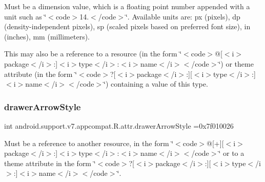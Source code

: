 Must be a dimension value, which is a floating point number appended with a unit such as \char`\"{}$<$code$>$14.\+5sp$<$/code$>$\char`\"{}. Available units are\+: px (pixels), dp (density-\/independent pixels), sp (scaled pixels based on preferred font size), in (inches), mm (millimeters). 

This may also be a reference to a resource (in the form \char`\"{}$<$code$>$@\mbox{[}$<$i$>$package$<$/i$>$\+:\mbox{]}$<$i$>$type$<$/i$>$\+:$<$i$>$name$<$/i$>$$<$/code$>$\char`\"{}) or theme attribute (in the form \char`\"{}$<$code$>$?\mbox{[}$<$i$>$package$<$/i$>$\+:\mbox{]}\mbox{[}$<$i$>$type$<$/i$>$\+:\mbox{]}$<$i$>$name$<$/i$>$$<$/code$>$\char`\"{}) containing a value of this type. \mbox{\label{classandroid_1_1support_1_1v7_1_1appcompat_1_1R_1_1attr_ac61eb48305cf35bb5538f1431089e7b1}} 
\subsubsection{\texorpdfstring{drawer\+Arrow\+Style}{drawerArrowStyle}}
{\footnotesize\ttfamily int android.\+support.\+v7.\+appcompat.\+R.\+attr.\+drawer\+Arrow\+Style =0x7f010026\hspace{0.3cm}{\ttfamily [static]}}

Must be a reference to another resource, in the form \char`\"{}$<$code$>$@\mbox{[}+\mbox{]}\mbox{[}$<$i$>$package$<$/i$>$\+:\mbox{]}$<$i$>$type$<$/i$>$\+:$<$i$>$name$<$/i$>$$<$/code$>$\char`\"{} or to a theme attribute in the form \char`\"{}$<$code$>$?\mbox{[}$<$i$>$package$<$/i$>$\+:\mbox{]}\mbox{[}$<$i$>$type$<$/i$>$\+:\mbox{]}$<$i$>$name$<$/i$>$$<$/code$>$\char`\"{}. \mbox{\label{classandroid_1_1support_1_1v7_1_1appcompat_1_1R_1_1attr_a29d0c6e43e9ec5af313b68651d53f4ec}} 

